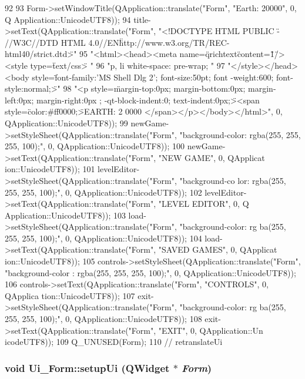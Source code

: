 \begin{DoxyCode}
92     {
93         Form->setWindowTitle(QApplication::translate("Form", "Earth: 20000", 0, Q
      Application::UnicodeUTF8));
94         title->setText(QApplication::translate("Form", "<!DOCTYPE HTML PUBLIC \"-
      //W3C//DTD HTML 4.0//EN\" \"http://www.w3.org/TR/REC-html40/strict.dtd\">\n"
95 "<html><head><meta name=\"qrichtext\" content=\"1\" /><style type=\"text/css\">\n
      "
96 "p, li { white-space: pre-wrap; }\n"
97 "</style></head><body style=\" font-family:'MS Shell Dlg 2'; font-size:50pt; font
      -weight:600; font-style:normal;\">\n"
98 "<p style=\" margin-top:0px; margin-bottom:0px; margin-left:0px; margin-right:0px
      ; -qt-block-indent:0; text-indent:0px;\"><span style=\" color:#ff0000;\">EARTH: 2
      0000 </span></p></body></html>", 0, QApplication::UnicodeUTF8));
99         newGame->setStyleSheet(QApplication::translate("Form", "background-color:
       rgba(255, 255, 255, 100);", 0, QApplication::UnicodeUTF8));
100         newGame->setText(QApplication::translate("Form", "NEW GAME", 0, QApplicat
      ion::UnicodeUTF8));
101         levelEditor->setStyleSheet(QApplication::translate("Form", "background-co
      lor: rgba(255, 255, 255, 100);", 0, QApplication::UnicodeUTF8));
102         levelEditor->setText(QApplication::translate("Form", "LEVEL EDITOR", 0, Q
      Application::UnicodeUTF8));
103         load->setStyleSheet(QApplication::translate("Form", "background-color: rg
      ba(255, 255, 255, 100);", 0, QApplication::UnicodeUTF8));
104         load->setText(QApplication::translate("Form", "SAVED GAMES", 0, QApplicat
      ion::UnicodeUTF8));
105         controls->setStyleSheet(QApplication::translate("Form", "background-color
      : rgba(255, 255, 255, 100);", 0, QApplication::UnicodeUTF8));
106         controls->setText(QApplication::translate("Form", "CONTROLS", 0, QApplica
      tion::UnicodeUTF8));
107         exit->setStyleSheet(QApplication::translate("Form", "background-color: rg
      ba(255, 255, 255, 100);", 0, QApplication::UnicodeUTF8));
108         exit->setText(QApplication::translate("Form", "EXIT", 0, QApplication::Un
      icodeUTF8));
109         Q_UNUSED(Form);
110     } // retranslateUi
\end{DoxyCode}
\hypertarget{class_ui___form_a90f69afe5c674331bdf041a051aee259}{
\subsubsection[{setupUi}]{\setlength{\rightskip}{0pt plus 5cm}void Ui\_\-Form::setupUi (QWidget $\ast$ {\em Form})}}
\label{class_ui___form_a90f69afe5c674331bdf041a051aee259}


